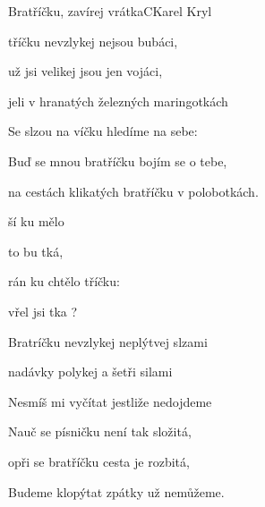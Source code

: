 \begin{song}{Bratříčku, zavírej vrátka}{C}{Karel Kryl}

\begin{SBVerse}

tříčku nevzlykej  nejsou bubáci,

 už jsi velikej  jsou jen vojáci,

jeli v hranatých železných maringotkách

\end{SBVerse}

\begin{SBVerse}

Se slzou na víčku hledíme na sebe:

Buď se mnou bratříčku bojím se o tebe,

na cestách klikatých bratříčku v polobotkách.

\end{SBVerse}

\begin{SBChorus}

ší  ku  mělo

to  bu tká,

rán ku  chtělo tříčku:

vřel jsi tka ?

\end{SBChorus}

\begin{SBVerse}

Bratríčku nevzlykej neplýtvej slzami

nadávky polykej a šetři silami

Nesmíš mi vyčítat jestliže nedojdeme

\end{SBVerse}

\begin{SBVerse}

Nauč se písničku není tak složitá,

opři se bratříčku cesta je rozbitá,

Budeme klopýtat zpátky už nemůžeme.

\end{SBVerse}

\begin{SBChorus}

\end{SBChorus}

\end{song}

\clearpage
